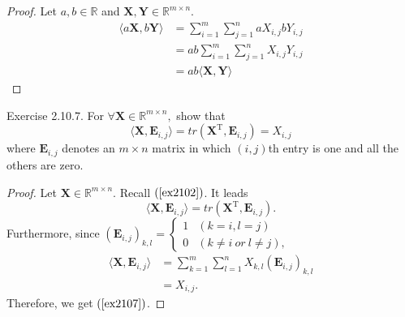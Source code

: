 \documentclass{article}
\theoremstyle{plain}
\begin{document}
\begin{proof}
	Let
	\begin{math}
		a , b \in \mathbb{R}
	\end{math}
	and
	\begin{math}
		\bm{X} , \bm{Y} \in \mathbb{R}^{m \times n} .
	\end{math}
	\begin{equation*}
		\begin{split}
			\langle a \bm{X} , b \bm{Y} \rangle &= \sum_{i=1}^m \sum_{j=1}^n a X_{i,j} b Y_{i,j} \\
			&= a b \sum_{i=1}^m \sum_{j=1}^n X_{i,j} Y_{i,j} \\
			&= a b \langle \bm{X} , \bm{Y} \rangle
		\end{split}
	\end{equation*}
\end{proof}

\begin{itembox}[l]{Exercise 2.10.7.}
	For
	\begin{math}
		\forall \bm{X} \in \mathbb{R}^{m \times n} ,
	\end{math}
	show that
	\begin{equation}
		\label{ex2107}
		\langle \bm{X} , \bm{E}_{i,j} \rangle
		= tr(\bm{X}^\mathrm{T} , \bm{E}_{i,j})
		= X_{i,j}
	\end{equation}
	where $\bm{E}_{i,j}$ denotes an $m \times n$ matrix in which $(i,j)$th entry is one
	and all the others are zero.
\end{itembox}

\begin{proof}
	Let $\bm{X} \in \mathbb{R}^{m \times n}$. Recall $(\ref{ex2102})$. It leads
	\begin{equation*}
		\langle \bm{X} , \bm{E}_{i,j} \rangle = tr(\bm{X}^\mathrm{T} , \bm{E}_{i,j}) .
	\end{equation*}
	Furthermore, since
	\begin{math}
		(\bm{E}_{i,j})_{k,l} =
		\begin{cases}
			1 & (k=i, l=j) \\
			0 & (k \neq i\ or\ l \neq j) ,
		\end{cases}
	\end{math}
	\begin{equation*}
		\begin{split}
			\langle \bm{X} , \bm{E}_{i,j} \rangle &= \sum_{k=1}^m \sum_{l=1}^n X_{k,l} (\bm{E}_{i,j})_{k,l} \\
			&= X_{i,j} .
		\end{split}
	\end{equation*}
	Therefore, we get $(\ref{ex2107})$.
\end{proof}
\end{document}
